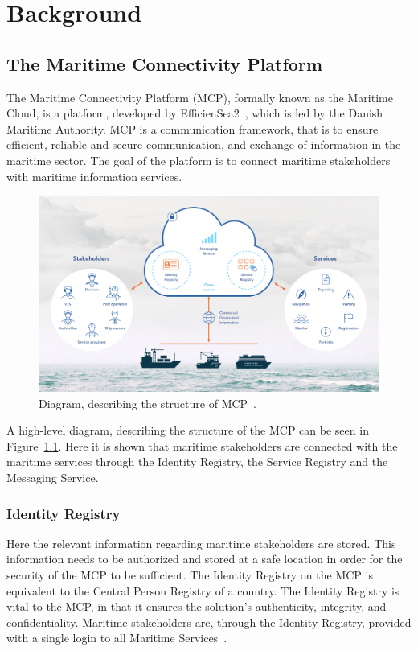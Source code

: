\chapter{Background}

\section{The Maritime Connectivity Platform}
The Maritime Connectivity Platform (MCP), formally known as the Maritime Cloud, is a platform, developed by EfficienSea2~\cite{efficienSea2}, which is led by the Danish Maritime Authority. 
MCP is a communication framework, that is to ensure efficient, reliable and secure communication, and exchange of information in the maritime sector.
The goal of the platform is to connect maritime stakeholders with maritime information services.
\begin{figure}
  \includegraphics[width=1\textwidth]{figures/MCPStructure}
  \caption{Diagram, describing the structure of MCP~\cite{efficienSea2}.}
  \label{fig:MCPStruct}
\end{figure}\noindent
A high-level diagram, describing the structure of the MCP can be seen in Figure~\ref{fig:MCPStruct}. Here it is shown that maritime stakeholders are connected with the maritime services through the Identity Registry, the Service Registry and the Messaging Service.

\subsection{Identity Registry}
Here the relevant information regarding maritime stakeholders are stored. This information needs to be authorized and stored at a safe location in order for the security of the MCP to be sufficient. The Identity Registry on the MCP is equivalent to the Central Person Registry of a country. The Identity Registry is vital to the MCP, in that it ensures the solution's authenticity, integrity, and confidentiality. Maritime stakeholders are, through the Identity Registry, provided with a single login to all Maritime Services~\cite{efficienSea2}.
